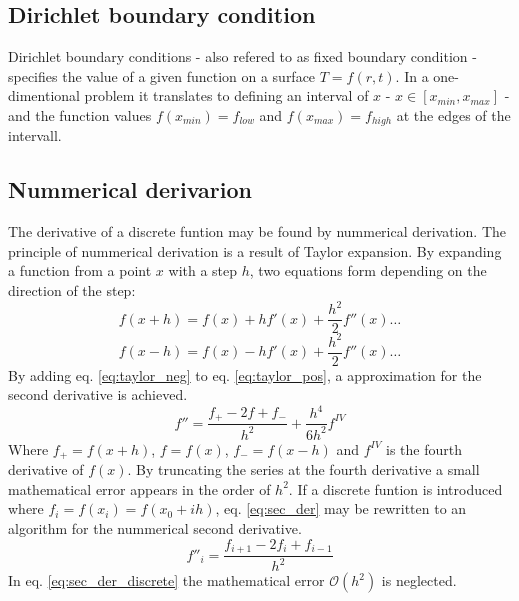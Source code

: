 \documentclass[twoside,twocolumn]{article}
\begin{document}
\subsection{Dirichlet boundary condition}
Dirichlet boundary conditions - also refered to as fixed boundary condition - specifies the value of a given function on a surface $T=f(r,t)$. In a one-dimentional problem it translates to defining an interval of $x$ - $x\in [x_{min},x_{max}]$ - and the function values $f(x_{min})=f_{low}$ and $f(x_{max})=f_{high}$ at the edges of the intervall.

\subsection{Nummerical derivarion}
The derivative of a discrete funtion may be found by nummerical derivation. The principle of nummerical derivation is a result of Taylor expansion. By expanding a function from   a point $x$ with a step $h$, two equations form depending on the direction of the step:
\begin{equation}
f(x+h) = f(x)+hf'(x)+\frac{h^2}{2}f''(x)\ldots \label{eq:taylor_pos}
\end{equation}
\begin{equation}
f(x-h) = f(x)-hf'(x)+\frac{h^2}{2}f''(x)\ldots \label{eq:taylor_neg}
\end{equation}
By adding eq. \ref{eq:taylor_neg} to eq. \ref{eq:taylor_pos}, a approximation for the second derivative is achieved.
\begin{equation}
f'' = \frac{f_+-2f+f_-}{h^2}+\frac{h^4}{6h^2}f^{\mathit{IV}}\label{eq:sec_der}
\end{equation}
Where $f_+ = f(x+h)$, $f=f(x)$, $f_-=f(x-h)$ and $f^{IV}$ is the fourth derivative of $f(x)$. By truncating the series at the fourth derivative a small mathematical error appears in the order of $h^2$. If a discrete funtion is introduced where $f_i = f(x_i) = f(x_0+ih)$, eq. \ref{eq:sec_der} may be rewritten to an algorithm for the nummerical second derivative.
\begin{equation}
f''_i = \frac{f_{i+1}-2f_i+f_{i-1}}{h^2}\label{eq:sec_der_discrete}
\end{equation}
In eq. \ref{eq:sec_der_discrete} the mathematical error $\mathcal{O}(h^2)$ is neglected.
\end{document}
